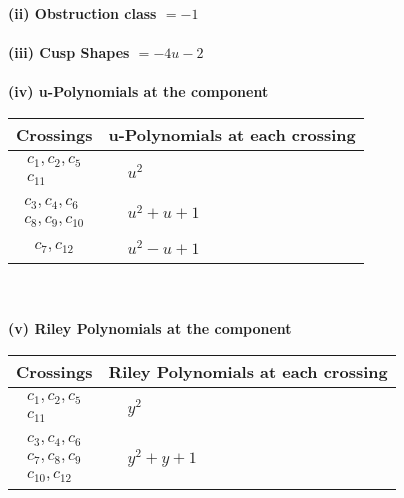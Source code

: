 \documentclass[1p]{elsarticle_modified}
\theoremstyle{definition}
\begin{document}
\flushleft \textbf{(ii) Obstruction class $= -1$}\\~\\
\flushleft \textbf{(iii) Cusp Shapes $= -4 u-2$}\\~\\
\newpage\renewcommand{\arraystretch}{1}
\flushleft \textbf{(iv) u-Polynomials at the component}\newline \\
\begin{tabular}{m{50pt}|m{274pt}}
Crossings & \hspace{64pt}u-Polynomials at each crossing \\
\hline $$\begin{aligned}c_{1},c_{2},c_{5}\\c_{11}\end{aligned}$$&$\begin{aligned}
&u^2
\end{aligned}$\\
\hline $$\begin{aligned}c_{3},c_{4},c_{6}\\c_{8},c_{9},c_{10}\end{aligned}$$&$\begin{aligned}
&u^2+u+1
\end{aligned}$\\
\hline $$\begin{aligned}c_{7},c_{12}\end{aligned}$$&$\begin{aligned}
&u^2- u+1
\end{aligned}$\\
\hline
\end{tabular}\\~\\
\newpage\renewcommand{\arraystretch}{1}
\flushleft \textbf{(v) Riley Polynomials at the component}\newline \\
\begin{tabular}{m{50pt}|m{274pt}}
Crossings & \hspace{64pt}Riley Polynomials at each crossing \\
\hline $$\begin{aligned}c_{1},c_{2},c_{5}\\c_{11}\end{aligned}$$&$\begin{aligned}
&y^2
\end{aligned}$\\
\hline $$\begin{aligned}c_{3},c_{4},c_{6}\\c_{7},c_{8},c_{9}\\c_{10},c_{12}\end{aligned}$$&$\begin{aligned}
&y^2+y+1
\end{aligned}$\\
\hline
\end{tabular}\\~\\
\end{document}
